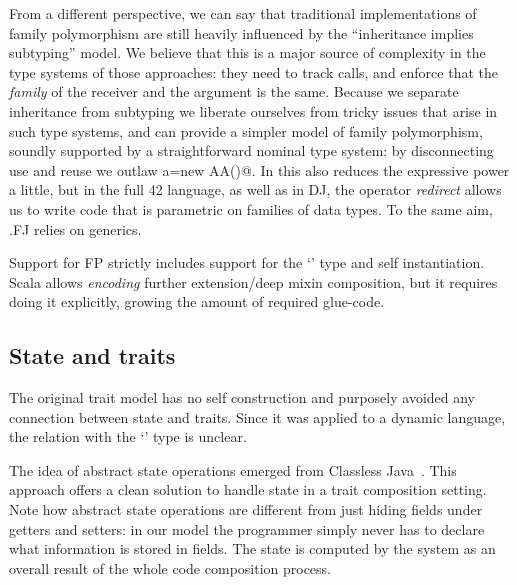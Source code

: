 From a different perspective, we can say that traditional
implementations of family polymorphism are still heavily influenced by
the ``inheritance implies subtyping'' model.
We believe that this is a major source of complexity in the type
systems of those approaches:
they need to track calls, and enforce that the \emph{family} of the receiver and the argument is the same.
Because we separate inheritance from subtyping we liberate ourselves
from tricky issues that arise in such type systems, and can
provide a simpler model of family polymorphism, soundly supported by 
a straightforward nominal type system:
by disconnecting use and reuse we outlaw \Q@A a=new AA()@.
In \name this also reduces the expressive power a little, but
in the full 42 language, as well as in DJ, the operator \emph{redirect} allows us to write code that is parametric on families of data types.
To the same aim, .FJ relies on generics.

Support for FP strictly includes
support for the `\Q@This@' type and self instantiation.
Scala allows \emph{encoding} further extension/deep mixin composition,
but it requires doing it explicitly, growing the amount of required glue-code.





\saveSpace
\subsection{State and traits}
\saveSpace
The original trait model has no self construction 
and purposely avoided any connection between state and traits.
Since it was applied to a dynamic language, the relation with the `\Q@This@' type is unclear.

The idea of abstract state operations emerged from Classless
Java~\cite{wang2016classless}. This approach offers a clean solution to handle state
in a trait composition setting.
Note how abstract state operations are different from just hiding fields under getters and setters: 
in our model the programmer simply never has to declare what information is stored in fields.
The state is computed by the system as an overall result of the whole code composition process.

